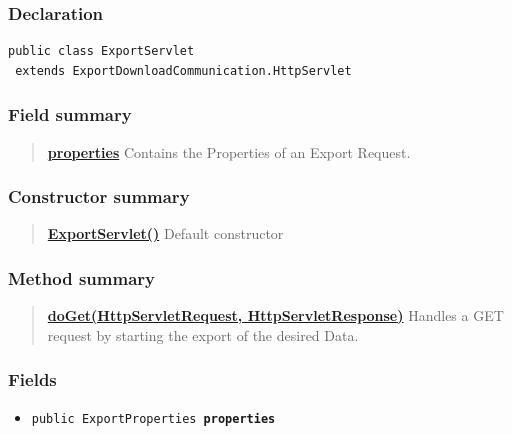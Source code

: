 {{{{{{{{{{{{{{{{{{{\subsubsection{Declaration}{
\begin{lstlisting}[frame=none]
public class ExportServlet
 extends ExportDownloadCommunication.HttpServlet\end{lstlisting}
\subsubsection{Field summary}{
\begin{verse}
\hyperlink{ExportDownloadCommunication.ExportServlet.properties}{{\bf properties}} Contains the Properties of an Export Request.\\
\end{verse}
}
\subsubsection{Constructor summary}{
\begin{verse}
\hyperlink{ExportDownloadCommunication.ExportServlet()}{{\bf ExportServlet()}} Default constructor\\
\end{verse}
}
\subsubsection{Method summary}{
\begin{verse}
\hyperlink{ExportDownloadCommunication.ExportServlet.doGet(HttpServletRequest, HttpServletResponse)}{{\bf doGet(HttpServletRequest, HttpServletResponse)}} Handles a GET request by starting the export of the desired Data.\\
\end{verse}
}
\subsubsection{Fields}{
\begin{itemize}
\item{
\label{ExportDownloadCommunication.ExportServlet.properties}\hypertarget{ExportDownloadCommunication.ExportServlet.properties}{\texttt{public ExportProperties\ {\bf  properties}}
}
}
\end{itemize}
}
}}}}}}}}}}}}}}}}}}}}
